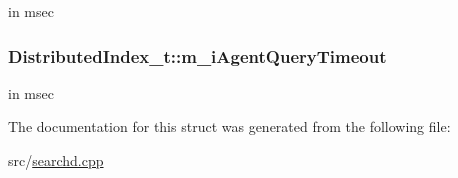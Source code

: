in msec 

\hypertarget{structDistributedIndex__t_a3158dadf0a6609da6d20ff828328ade8}{
\subsubsection[{m\-\_\-i\-Agent\-Query\-Timeout}]{ Distributed\-Index\-\_\-t\-::m\-\_\-i\-Agent\-Query\-Timeout}}\label{structDistributedIndex__t_a3158dadf0a6609da6d20ff828328ade8}


in msec 



The documentation for this struct was generated from the following file\-:\begin{DoxyCompactItemize}
\item 
src/\hyperlink{searchd_8cpp}{searchd.\-cpp}\end{DoxyCompactItemize}
